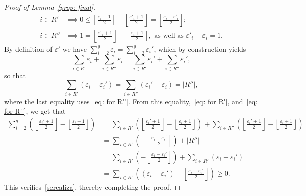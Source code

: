 \documentclass[10pt,a4paper]{amsart}
\begin{document}
\begin{proof}[Proof of Lemma~\ref{prop: final}]
\begin{align}
i\in R'& \implies 0\leq\left\lfloor\frac{\varepsilon_i+1}{2}\right\rfloor-\left\lfloor\frac{\varepsilon'_i+1}{2}\right\rfloor=\left\lfloor\frac{\varepsilon_i-\varepsilon'_i}{2}\right\rfloor; \label{eq: for R'}
\\
i\in R''& \implies  1=\left\lfloor\frac{\varepsilon'_i+1}{2}\right\rfloor-\left\lfloor\frac{\varepsilon_i+1}{2}\right\rfloor, \text{ as well as } \varepsilon'_i-\varepsilon_i=1.\label{eq: for R''}
\end{align}
By definition of $\varepsilon'$ we have $\sum_{i=2}^g\varepsilon_i=\sum_{i=2}^g\varepsilon_i'$, which by construction yields
\begin{equation*}
    \sum_{i\in R'}\varepsilon_i+ \sum_{i\in R''}\varepsilon_i=\sum_{i\in R'}\varepsilon_i'+\sum_{i\in R''}\varepsilon_i',
\end{equation*}
so that
\[
\sum_{i\in R'}\left(\varepsilon_i-\varepsilon_i'\right)= \sum_{i\in R''}\left(\varepsilon_i'-\varepsilon_i\right)=|R''|,
\]
where the last equality uses~\eqref{eq: for R''}. From this equality,~\eqref{eq: for R'}, and~\eqref{eq: for R''}, we get that
\begin{align*}
\sum_{i=2}^g \left(\left\lfloor\frac{\varepsilon_i'+1}{2}\right\rfloor-\left\lfloor\frac{\varepsilon_i+1}{2}\right\rfloor\right) & = \sum_{i\in R'} \left(\left\lfloor\frac{\varepsilon_i'+1}{2}\right\rfloor-\left\lfloor\frac{\varepsilon_i+1}{2}\right\rfloor\right) + \sum_{i\in R''} \left(\left\lfloor\frac{\varepsilon_i'+1}{2}\right\rfloor-\left\lfloor\frac{\varepsilon_i+1}{2}\right\rfloor\right) 
\\ 
& =\sum_{i\in R'}\left(-\left\lfloor\frac{\varepsilon_i-\varepsilon_i'}{2}\right\rfloor\right)+|R''| 
\\ 
&= \sum_{i\in R'}\left(-\left\lfloor\frac{\varepsilon_i-\varepsilon_i'}{2}\right\rfloor\right)+\sum_{i\in R'}\left(\varepsilon_i-\varepsilon_i'\right) 
\\ 
&= \sum_{i\in R'}\left(\left(\varepsilon_i-\varepsilon_i'\right)-\left\lfloor\frac{\varepsilon_i-\varepsilon_i'}{2}\right\rfloor\right)\ge 0.
\end{align*}
This verifies~\eqref{serealiza}, thereby completing the proof. 
\end{proof}
\end{document}
